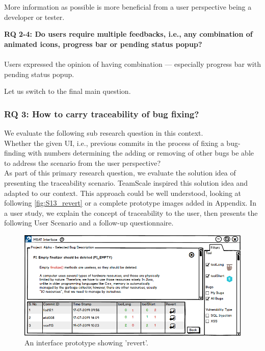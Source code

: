 \begin{myboxi}
	More information as possible is more beneficial from a user perspective being a developer or tester.
\end{myboxi}

\begin{myboxi}{ \textbf{RQ 2-4: Do users require multiple feedbacks, i.e., any combination of animated icons, progress bar or pending status popup?}} 
\\ \\	Users expressed the opinion of having combination — especially progress bar with pending status popup.
\end{myboxi} 
\hfill \break
Let us switch to the final main question. \\

\subsubsection{RQ 3: How to carry traceability of bug fixing?}

We evaluate the following sub research question in this context. \\

Whether the given UI, i.e., previous commits in the process of fixing a bug-finding with numbers determining the adding or removing of other bugs be able to address the scenario from the user perspective? \\

As part of this primary research question, we evaluate the solution idea of presenting the traceability scenario. TeamScale inspired this solution idea and adapted to our context. This approach could be well understood, looking at following \autoref{fig:S13_revert} or a complete prototype images added in Appendix. In a user study, we explain the concept of traceability to the user, then presents the following User Scenario and a follow-up questionnaire. \\

\begin{figure}[hbt!]
	\centering
	\includegraphics[width=\linewidth]{figures/solution_ideas_snaps/S13_revert}
	\caption{An interface prototype showing 'revert'.}
	\label{fig:S13_revert}
\end{figure}


